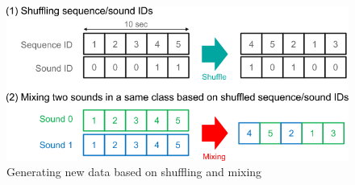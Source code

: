 \begin{figure}[htbp]
	\centering
	\includegraphics[scale=0.5]{baa-documentation/img/DCASE_data_augmentation.png}
	\caption[Generating new data based on shuffling and mixing]{Generating new data based on shuffling and mixing \footnotemark}
	\label{fig:DCASE-Data-Augmentation}
\end{figure}

